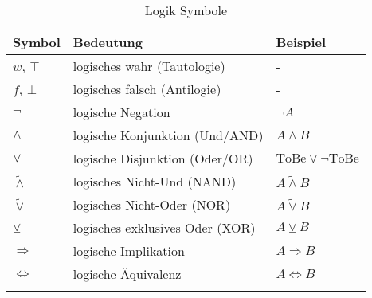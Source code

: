 \documentclass[../main.tex]{subfiles}
\begin{document}
	
	\newcommand{\newNotationRow}{\\[2.5mm]}
	
	\begin{longtable}{p{30mm}p{60mm}p{65mm}} %
		\toprule 
		
		\centering Symbol & Bedeutung & Beispiel \newNotationRow
		
		\midrule
				
		
		\centering $w$, $\top$ & logisches wahr (Tautologie) & - \newNotationRow
		
		\centering $f$, $\bot$ & logisches falsch (Antilogie) & - \newNotationRow
				
		\centering $\lnot$ & logische Negation & $\lnot A$ \newNotationRow
		
		\centering $\land$ & logische Konjunktion (Und/AND) & $A \land B$ \newNotationRow
		
		\centering $\lor$ & logische Disjunktion (Oder/OR) & $\textrm{ToBe} \lor \lnot \textrm{ToBe}$ \newNotationRow
		
		\centering $\tilde\land$ & logisches Nicht-Und (NAND) & $A \tilde\land B$ \newNotationRow
		
		\centering $\tilde\lor$ & logisches Nicht-Oder (NOR) & $A \tilde\lor B$ \newNotationRow
		
		\centering $\veebar$ & logisches exklusives Oder (XOR) & $A \veebar B$ \newNotationRow
		
		\centering $\Rightarrow$ & logische Implikation & $A \Rightarrow B$ \newNotationRow
		
		\centering $\Leftrightarrow$ & logische Äquivalenz & $A \Leftrightarrow B$ \newNotationRow
		
		\bottomrule
		
		\caption{Logik Symbole}
	\end{longtable}
\end{document}
